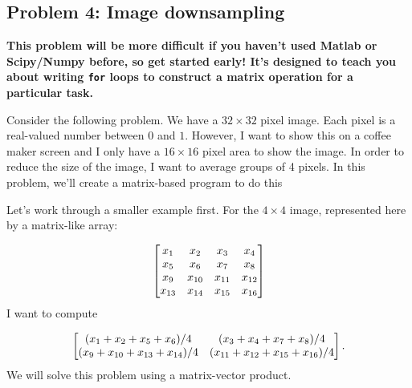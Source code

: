 \documentclass{article}
\begin{document}
\hypertarget{problem_4_image_downsampling_6}{}\subsection*{{Problem 4: Image downsampling}}\label{problem_4_image_downsampling_6}

\textbf{This problem will be more difficult if you haven'{}t used Matlab or Scipy/Numpy before, so get started early! It'{}s designed to teach you about writing {\colorbox[rgb]{1.00,0.93,1.00}{\tt for}} loops to construct a matrix operation for a particular task.}

Consider the following problem. We have a $32 \times 32$ pixel image. Each pixel is a real-valued number between $0$ and $1$. However, I want to show this on a coffee maker screen and I only have a $16 \times 16$ pixel area to show the image. In order to reduce the size of the image, I want to average groups of 4 pixels. In this problem, we'{}ll create a matrix-based program to do this

Let'{}s work through a smaller example first. For the $4 \times 4$ image, represented here by a matrix-like array:

\begin{displaymath}
\begin{bmatrix}  x_{1} & x_2 & x_3 & x_4 \\          x_5 & x_6 & x_7 & x_8 \\
          x_9 & x_{10} & x_{11} & x_{12} \\
          x_{13} & x_{14} & x_{15} & x_{16}  \end{bmatrix}
\end{displaymath}
I want to compute

\begin{displaymath}
\begin{bmatrix}  (x_1 + x_2 + x_5 + x_6)/4 & (x_3 + x_4 + x_7 + x_8)/4 \\   (x_9 + x_{10} + x_{13} + x_{14})/4 & (x_{11} + x_{12} + x_{15} + x_{16})/4  \end{bmatrix}.
\end{displaymath}
We will solve this problem using a matrix-vector product.
\end{document}
